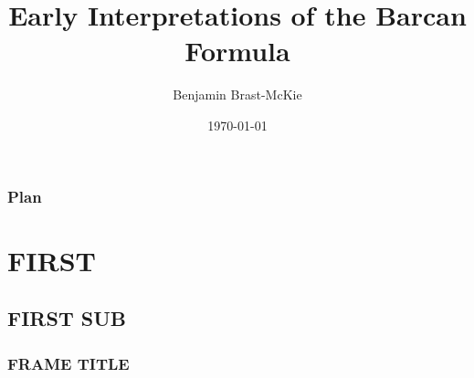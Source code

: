 \documentclass{beamer}
\title[Short title]{Early Interpretations of the Barcan Formula} %
\author{Benjamin Brast-McKie} %
\institute[Oxford] %
{
University of Oxford \\ %
\medskip
\textit{benjamin.brast-mckie@philosophy.ox.ac.uk} %
}
\date{\today} %
\begin{document}
\begin{frame}
\titlepage %
\end{frame}

\begin{frame}
\frametitle{Plan}

\tableofcontents[hideallsubsections]

\end{frame}








\section{FIRST} 

\subsection{FIRST SUB}

\begin{frame}
\frametitle{FRAME TITLE}



\end{frame}






\end{document}
